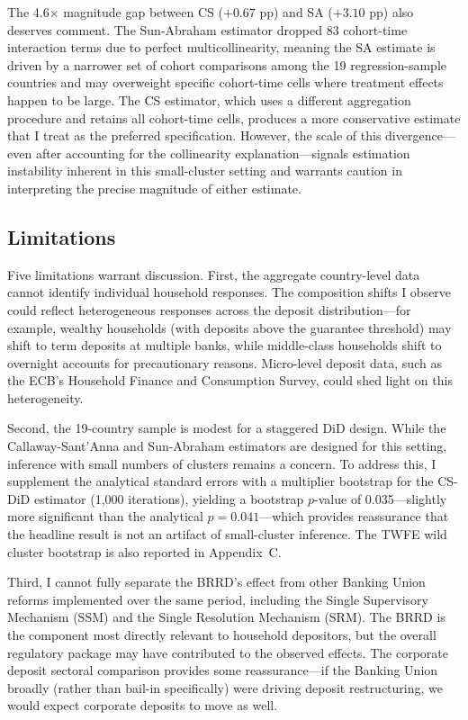 \documentclass[12pt]{article}
\begin{document}
The 4.6$\times$ magnitude gap between CS ($+0.67$ pp) and SA ($+3.10$ pp) also deserves comment. The Sun-Abraham estimator dropped 83 cohort-time interaction terms due to perfect multicollinearity, meaning the SA estimate is driven by a narrower set of cohort comparisons among the 19 regression-sample countries and may overweight specific cohort-time cells where treatment effects happen to be large. The CS estimator, which uses a different aggregation procedure and retains all cohort-time cells, produces a more conservative estimate that I treat as the preferred specification. However, the scale of this divergence---even after accounting for the collinearity explanation---signals estimation instability inherent in this small-cluster setting and warrants caution in interpreting the precise magnitude of either estimate.

\subsection{Limitations}

Five limitations warrant discussion. First, the aggregate country-level data cannot identify individual household responses. The composition shifts I observe could reflect heterogeneous responses across the deposit distribution---for example, wealthy households (with deposits above the guarantee threshold) may shift to term deposits at multiple banks, while middle-class households shift to overnight accounts for precautionary reasons. Micro-level deposit data, such as the ECB's Household Finance and Consumption Survey, could shed light on this heterogeneity.

Second, the 19-country sample is modest for a staggered DiD design. While the Callaway-Sant'Anna and Sun-Abraham estimators are designed for this setting, inference with small numbers of clusters remains a concern. To address this, I supplement the analytical standard errors with a multiplier bootstrap for the CS-DiD estimator (1,000 iterations), yielding a bootstrap $p$-value of 0.035---slightly more significant than the analytical $p = 0.041$---which provides reassurance that the headline result is not an artifact of small-cluster inference. The TWFE wild cluster bootstrap is also reported in Appendix~C.

Third, I cannot fully separate the BRRD's effect from other Banking Union reforms implemented over the same period, including the Single Supervisory Mechanism (SSM) and the Single Resolution Mechanism (SRM). The BRRD is the component most directly relevant to household depositors, but the overall regulatory package may have contributed to the observed effects. The corporate deposit sectoral comparison provides some reassurance---if the Banking Union broadly (rather than bail-in specifically) were driving deposit restructuring, we would expect corporate deposits to move as well.
\end{document}
